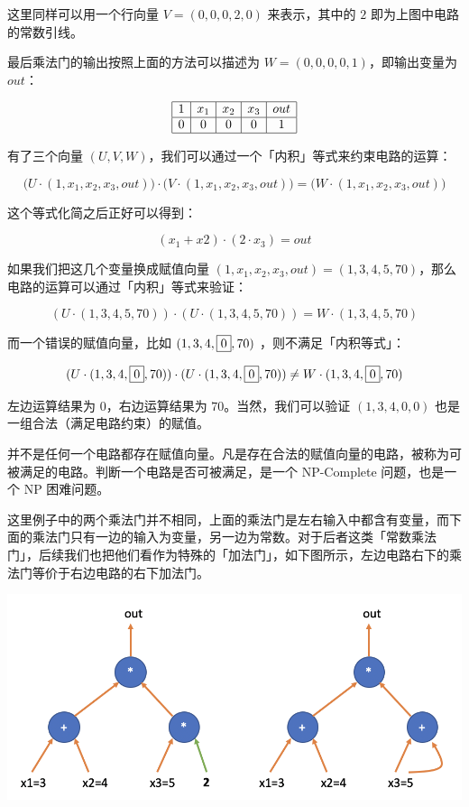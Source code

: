 这里同样可以用一个行向量 \(V=(0,0,0,2,0)\) 来表示，其中的 \(2\)
即为上图中电路的常数引线。

最后乘法门的输出按照上面的方法可以描述为 \(W=(0,0,0,0,1)\)，即输出变量为
\(out\)：

\[
\begin{array}{|c|c|c|c|c|}
\hline
1 & x_1 & x_2 & x_3 & out \\
\hline
0 & 0 & 0 & 0 & 1 \\
\hline
\end{array}
\]

有了三个向量 \((U,V,W)\)，我们可以通过一个「内积」等式来约束电路的运算：

\[
\big(U\cdot(1,x_1, x_2,x_3,out)\big) \cdot \big(V\cdot(1,x_1, x_2,x_3,out)\big) = \big(W\cdot(1,x_1, x_2,x_3,out)\big)
\]

这个等式化简之后正好可以得到：

\[
(x_1 + x2) \cdot (2\cdot x_3) = out
\]

如果我们把这几个变量换成赋值向量
\((1,x_1,x_2,x_3,out) = (1,3,4,5,70)\)，那么电路的运算可以通过「内积」等式来验证：

\[
(U\cdot(1,3,4,5,70))\cdot(U\cdot(1,3,4,5,70))=W\cdot(1,3,4,5,70)
\]

而一个错误的赋值向量，比如 \((1,3,4,\fbox{0},70)\)
，则不满足「内积等式」：

\[
(U\cdot(1,3,4,\fbox{0},70))\cdot(U\cdot(1,3,4,\fbox{0},70))\neq W\cdot(1,3,4,\fbox{0},70)
\]

左边运算结果为 \(0\)，右边运算结果为 \(70\)。当然，我们可以验证
\((1,3,4,0,0)\) 也是一组合法（满足电路约束）的赋值。

并不是任何一个电路都存在赋值向量。凡是存在合法的赋值向量的电路，被称为可被满足的电路。判断一个电路是否可被满足，是一个
NP-Complete 问题，也是一个 NP 困难问题。

这里例子中的两个乘法门并不相同，上面的乘法门是左右输入中都含有变量，而下面的乘法门只有一边的输入为变量，另一边为常数。对于后者这类「常数乘法门」，后续我们也把他们看作为特殊的「加法门」，如下图所示，左边电路右下的乘法门等价于右边电路的右下加法门。

\includegraphics[scale=0.5]{img/img20230423133455.png}

